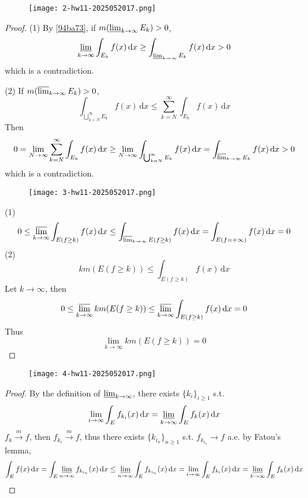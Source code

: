 \begin{exercise}
\begin{figure}[H]
\centering
\texttt{[image: 2-hw11-2025052017.png]}
\label{}
\end{figure}
\end{exercise}
\begin{proof}
(1)
By \cref{94ba73}, if $m(\varliminf_{ k \to \infty }E_k)>0$,
\[
\varliminf_{ k \to \infty } \int_{E_k}^{} f(x) \, \mathrm{d}x \geq \int_{\varliminf_{ k \to \infty } E_k}^{} f(x) \, \mathrm{d}x >0
\]
which is a contradiction.

(2)
If $m(\varlimsup_{ k \to \infty }E_k)>0$,
\[
 \int_{\bigcup_{k=N}^{\infty} E_k}^{}f(x)  \, \mathrm{d}x \leq \sum_{k=N}^{\infty}\int_{E_k}^{} f(x) \, \mathrm{d}x  
\]
Then
\[
0=\lim_{ N \to \infty } \sum_{k=N}^{\infty} \int_{E_k}^{} f(x) \, \mathrm{d}x \geq \lim_{ N \to \infty } \int_{\bigcup_{k=N}^{\infty} E_k}^{} f(x) \, \mathrm{d}x =\int_{\varlimsup_{ k \to \infty } E_k}^{} f(x) \, \mathrm{d}x>0
\]
which is a contradiction.

\begin{exercise}
\begin{figure}[H]
\centering
\texttt{[image: 3-hw11-2025052017.png]}
\label{}
\end{figure}
\end{exercise}
(1)
\[
0\leq \varlimsup_{ k \to \infty } \int_{E(f\geq k)}^{} f(x) \, \mathrm{d}x \leq \int_{\varlimsup_{ k \to \infty } E(f\geq k)}^{} f(x) \, \mathrm{d}x =\int_{E(f=+\infty)}^{} f(x) \, \mathrm{d}x =0
\]
(2)
\[
km(E(f\geq k))\leq \int_{E(f\geq k)}^{} f(x) \, \mathrm{d}x
\]
Let $k\to \infty$, then
\[
0\leq \varlimsup_{ k \to \infty } km(E(f\geq k))\leq \varlimsup_{ k \to \infty } \int_{E(f\geq k)}^{} f(x) \, \mathrm{d}x =0
\]
Thus
\[
\lim_{ k \to \infty } km(E(f\geq k))=0
\]
\end{proof}

\begin{exercise}
\begin{figure}[H]
\centering
\texttt{[image: 4-hw11-2025052017.png]}
\label{}
\end{figure}\label{5b171e}
\end{exercise}

\begin{proof}
By the definition of $\varliminf_{ k \to \infty }$, there exists $\{ k_{i} \}_{i\geq1}$ s.t.
\[
\lim_{ i \to \infty } \int_{E}^{} f_{k_i} (x)\, \mathrm{d}x=\varliminf_{ k \to \infty } \int_{E}^{} f_k (x)\, \mathrm{d}x  
\]
$f_k\overset{ m }{ \to }f$, then $f_{k_{i}}\overset{ m }{ \to }f$, thus there exists $\{ k_{i_{n}} \}_{n\geq1}$ s.t. $f_{k_{i_{n}}}\to f$ a.e. by Fatou's lemma,
\[
\int_{E}^{} f(x) \, \mathrm{d}x =\int_{E}^{} \varliminf_{ n \to \infty }  f_{k_{i_n}}(x) \, \mathrm{d}x \leq \varliminf_{ n \to \infty } \int_{E}^{} f_{k_{i_{n}}}(x) \, \mathrm{d}x =\lim_{ i \to \infty } \int_{E}^{} f_{k_i}(x) \, \mathrm{d}x =\varliminf_{ k \to \infty } \int_{E}^{} f_k(x) \, \mathrm{d}x
\]
\end{proof}

